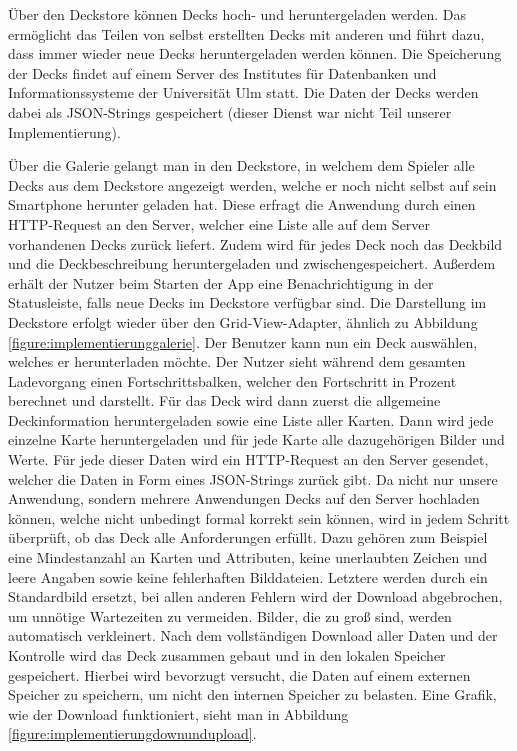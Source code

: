 Über den Deckstore können Decks hoch- und heruntergeladen werden. Das ermöglicht das Teilen von selbst erstellten Decks mit anderen und führt dazu, dass immer wieder neue Decks heruntergeladen werden können. Die Speicherung der Decks findet auf einem Server des Institutes für Datenbanken und Informationssysteme der Universität Ulm statt. Die Daten der Decks werden dabei als JSON-Strings gespeichert (dieser Dienst war nicht Teil unserer Implementierung).

Über die Galerie gelangt man in den Deckstore, in welchem dem Spieler alle Decks aus dem Deckstore angezeigt werden, welche er noch nicht selbst auf sein Smartphone herunter geladen hat. Diese erfragt die Anwendung durch einen HTTP-Request an den Server, welcher eine Liste alle auf dem Server vorhandenen Decks zurück liefert. Zudem wird für jedes Deck noch das Deckbild und die Deckbeschreibung heruntergeladen und zwischengespeichert. Außerdem erhält der Nutzer beim Starten der App eine Benachrichtigung in der Statusleiste, falls neue Decks im Deckstore verfügbar sind. Die Darstellung im Deckstore erfolgt wieder über den Grid-View-Adapter, ähnlich zu Abbildung \ref{figure:implementierunggalerie}. Der Benutzer kann nun ein Deck auswählen, welches er herunterladen möchte. Der Nutzer sieht während dem gesamten Ladevorgang einen Fortschrittsbalken, welcher den Fortschritt in Prozent berechnet und darstellt. Für das Deck wird dann zuerst die allgemeine Deckinformation heruntergeladen sowie eine Liste aller Karten. Dann wird jede einzelne Karte heruntergeladen und für jede Karte alle dazugehörigen Bilder und Werte. Für jede dieser Daten wird ein HTTP-Request an den Server gesendet, welcher die Daten in Form eines JSON-Strings zurück gibt. Da nicht nur unsere Anwendung, sondern mehrere Anwendungen Decks auf den Server hochladen können, welche nicht unbedingt formal korrekt sein können, wird in jedem Schritt überprüft, ob das Deck alle Anforderungen erfüllt. Dazu gehören zum Beispiel eine Mindestanzahl an Karten und Attributen, keine unerlaubten Zeichen und leere Angaben sowie keine fehlerhaften Bilddateien. Letztere werden durch ein Standardbild ersetzt, bei allen anderen Fehlern wird der Download abgebrochen, um unnötige Wartezeiten zu vermeiden. Bilder, die zu groß sind, werden automatisch verkleinert. Nach dem vollständigen Download aller Daten und der Kontrolle wird das Deck zusammen gebaut und in den lokalen Speicher gespeichert. Hierbei wird bevorzugt versucht, die Daten auf einem externen Speicher zu speichern, um nicht den internen Speicher zu belasten. Eine Grafik, wie der Download funktioniert, sieht man in Abbildung \ref{figure:implementierungdownundupload}.

